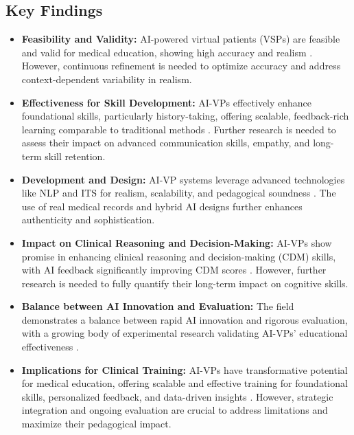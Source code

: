 \subsection*{\textbf{Key Findings}}

\begin{itemize}
\item \textbf{Feasibility and Validity:} AI-powered virtual patients (VSPs) are feasible and valid for medical education, showing high accuracy and realism \cite{holderried_generative_2024, wang_application_2025, maicher_using_2019, de_mattei_are_2024}. However, continuous refinement is needed to optimize accuracy and address context-dependent variability in realism.
\item \textbf{Effectiveness for Skill Development:} AI-VPs effectively enhance foundational skills, particularly history-taking, offering scalable, feedback-rich learning comparable to traditional methods \cite{holderried_language_2024, lippitsch_development_2024, shorey_virtual_2019, jingrong_du_history-taking_2022, co_using_2022}. Further research is needed to assess their impact on advanced communication skills, empathy, and long-term skill retention.
\item \textbf{Development and Design:} AI-VP systems leverage advanced technologies like NLP and ITS for realism, scalability, and pedagogical soundness \cite{furlan_natural_2021, maicher_artificial_2023, wang_artificial_2025, wang_intelligent_2022}. The use of real medical records and hybrid AI designs further enhances authenticity and sophistication.
\item \textbf{Impact on Clinical Reasoning and Decision-Making:} AI-VPs show promise in enhancing clinical reasoning and decision-making (CDM) skills, with AI feedback significantly improving CDM scores \cite{brugge_large_2024, furlan_learning_2022, anthamatten_integrating_2024}. However, further research is needed to fully quantify their long-term impact on cognitive skills.
\item \textbf{Balance between AI Innovation and Evaluation:} The field demonstrates a balance between rapid AI innovation and rigorous evaluation, with a growing body of experimental research validating AI-VPs' educational effectiveness \cite{holderried_language_2024, brugge_large_2024}.
\item \textbf{Implications for Clinical Training:} AI-VPs have transformative potential for medical education, offering scalable and effective training for foundational skills, personalized feedback, and data-driven insights \cite{co_using_2022, furlan_learning_2022}. However, strategic integration and ongoing evaluation are crucial to address limitations and maximize their pedagogical impact.
\end{itemize}


